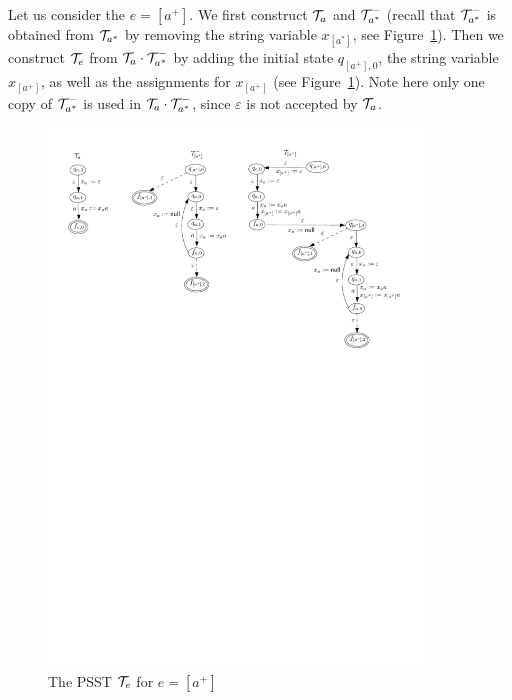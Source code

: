 \begin{example}\label{exmp-pfa}
Let us consider the {\pcre} $e = [a^+]$. 
We first construct $\mathcal{T}_{a}$ and $\mathcal{T}^-_{a^*}$ (recall that $\mathcal{T}^-_{a^*}$ is obtained from $\mathcal{T}_{a^*}$ by removing the string variable $x_{[a^*]}$, see Figure~\ref{fig-pfa}).  Then we construct $\mathcal{T}_{e}$ from $\mathcal{T}_{a} \cdot \mathcal{T}^-_{a^*}$ by adding the initial state $q_{[a^+],0}$, the string variable $x_{[a^+]}$, as well as the assignments for $x_{[a^+]}$ (see Figure~\ref{fig-pfa}). Note here only one copy of $\mathcal{T}^-_{a^*}$ is used in $\mathcal{T}_{a} \cdot \mathcal{T}^-_{a^*}$, since $\varepsilon$ is not accepted by $\mathcal{T}_{a}$.
	\begin{figure}[ht]
		
		\centering
		\includegraphics[width=0.9\textwidth]{pfa-new.pdf}
		\caption{The PSST $\mathcal{T}_e$ for $e = [a^+]$}
		\label{fig-pfa}
		

\end{figure}
\end{example}
